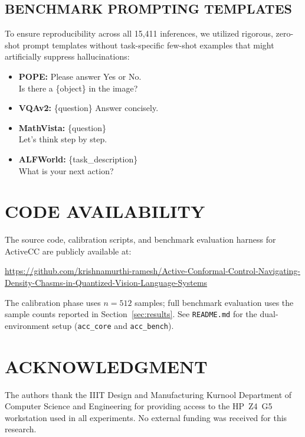 \documentclass{ieeetmlcn}
\begin{document}
\subsection{BENCHMARK PROMPTING TEMPLATES}
To ensure reproducibility across all 15,411 inferences, we utilized rigorous, zero-shot prompt templates without task-specific few-shot examples that might artificially suppress hallucinations:
\begin{itemize}
\item \textbf{POPE:} {\small\ttfamily [Image] Please answer Yes or No.\\Is there a \{object\} in the image?}
\item \textbf{VQAv2:} {\small\ttfamily [Image] \{question\} Answer concisely.}
\item \textbf{MathVista:} {\small\ttfamily [Image] \{question\}\\Let's think step by step.}
\item \textbf{ALFWorld:} {\small\ttfamily [Task] \{task\_description\}\\What is your next action?}
\end{itemize}


\section*{CODE AVAILABILITY}
The source code, calibration scripts, and benchmark evaluation harness for ActiveCC are publicly available at:
\begin{center}
\url{https://github.com/krishnamurthi-ramesh/Active-Conformal-Control-Navigating-Density-Chasms-in-Quantized-Vision-Language-Systems}
\end{center}
The calibration phase uses $n=512$ samples; full benchmark evaluation uses the sample counts reported in Section~\ref{sec:results}. See \texttt{README.md} for the dual-environment setup (\texttt{acc\_core} and \texttt{acc\_bench}).

\section*{ACKNOWLEDGMENT}
The authors thank the IIIT Design and Manufacturing Kurnool Department of Computer Science and Engineering for providing access to the HP~Z4~G5 workstation used in all experiments. No external funding was received for this research.

\nocite{*}



\newpage
\end{document}
